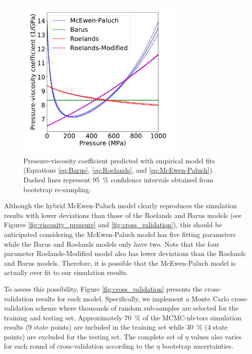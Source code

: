 \documentclass[preprint,review,12pt]{elsarticle}
\begin{document}
	\begin{figure}[htb!]
		\centering
		\includegraphics[width=3.2in]{Pressure_viscosity_coefficient.pdf}
		\caption{Pressure-viscosity coefficient predicted with empirical model fits (Equations \ref{eq:Barus}, \ref{eq:Roelands}, and \ref{eq:McEwen-Paluch}). Dashed lines represent 95~\% confidence intervals obtained from bootstrap re-sampling.}
		\label{fig:viscosity_pressure_coefficent}
	\end{figure}

	
	
	Although the hybrid McEwen-Paluch model clearly reproduces the simulation results with lower deviations than those of the Roelands and Barus models (see Figures \ref{fig:viscosity_pressure} and \ref{fig:cross_validation}), this should be anticipated considering the McEwen-Paluch model has five fitting parameters while the Barus and Roelands models only have two. Note that the four parameter Roelands-Modified model also has lower deviations than the Roelands and Barus models. Therefore, it is possible that the McEwen-Paluch model is actually over fit to our simulation results. 
	
	To assess this possibility, Figure \ref{fig:cross_validation} presents the cross-validation results for each model. Specifically, we implement a Monte Carlo cross-validation scheme where thousands of random sub-samples are selected for the training and testing set. Approximately 70~\% of the MCMC-nb-tors simulation results (9 state points) are included in the training set while 30~\% (4 state points) are excluded for the testing set. The complete set of $\eta$ values also varies for each round of cross-validation according to the $\eta$ bootstrap uncertainties. 
	
\end{document}

